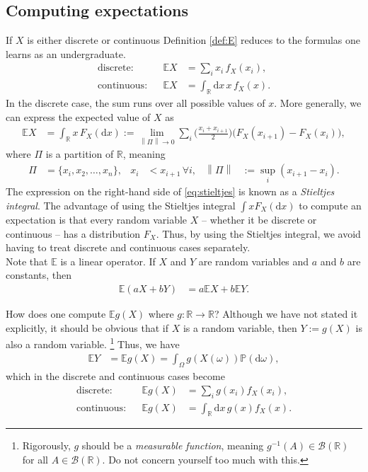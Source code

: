 \documentclass[12pt]{book}
\numberwithin{equation}{chapter}
\theoremstyle{plain}
\numberwithin{theorem}{section}
\theoremstyle{definition}
\numberwithin{exercise}{chapter}
\newcommand{\<}{\langle}
\renewcommand{\>}{\rangle}
\renewcommand{\(}{\left(}
\renewcommand{\)}{\right)}
\renewcommand{\[}{\left[}
\renewcommand{\]}{\right]}
\newcommand\Eb{\mathds{E}}
\newcommand\Pb{\mathds{P}}
\newcommand\Rb{\mathds{R}}
\newcommand\Bc{\mathscr{B}}
\newcommand\om{\omega}
\newcommand\Om{\Omega}
\newcommand\dd{\mathrm{d}}
\newcommand{\norm}[1]{\left\|#1\right\|}
\begin{document}
\subsection{Computing expectations}
If $X$ is either discrete or continuous Definition \ref{def:E} reduces to the formulas one learns as an undergraduate.
\begin{align}
\text{discrete}:&&
\Eb X
	&=	\sum_i x_i \, f_X(x_i) , \\
\text{continuous}:&&
\Eb X
	&=	\int_\Rb \dd x \, x \,  f_X(x) .
\end{align}
In the discrete case, the sum runs over all possible values of $x$.  More generally, we can express the expected value of $X$ as
\begin{align}
\Eb X
	&=	\int_\Rb x \, F_X(\dd x) 
	:=	\lim_{\norm{\Pi} \to 0} \sum_i \Big( \frac{x_i + x_{i+1}}{2} \Big) \Big( F_X(x_{i+1}) - F_X(x_i) \Big) , \label{eq:stieltjes} 
\end{align}
where $\Pi$ is a partition of $\Rb$, meaning
\begin{align}
\Pi
	&=	\{ x_i, x_2, \ldots , x_n \} , &
x_i
	&< x_{i+1} \, \forall i , &
\norm{\Pi}
	&:= \sup_i ( x_{i+1} - x_i ) .
\end{align}
The expression on the right-hand side of \eqref{eq:stieltjes} is known as a \emph{Stieltjes integral}.
The advantage of using the Stieltjes integral $\int x F_X(\dd x)$ to compute an expectation is that every random variable $X$ -- whether it be discrete or continuous -- has a distribution $F_X$.  Thus, by using the Stieltjes integral, we avoid having to treat discrete and continuous cases separately.
\\[0.5em]
Note that $\Eb$ is a linear operator.  If $X$ and $Y$ are random variables and $a$ and $b$ are constants, then
\begin{align}
\Eb( a X + b Y )
	&=	a \Eb X + b \Eb Y .
\end{align}

\noindent
How does one compute $\Eb g(X)$ where $g:\Rb \to \Rb$?  Although we have not stated it explicitly, it should be obvious that if $X$ is a random variable, then $Y:=g(X)$ is also a random variable.
\footnote{Rigorously, $g$ should be a \emph{measurable function}, meaning $g^{-1}(A) \in \Bc(\Rb)$ for all $A \in \Bc(\Rb)$.  Do not concern yourself too much with this.}
Thus, we have
\begin{align}
\Eb Y
	&=	\Eb g(X)
	=		\int_\Om g(X(\om)) \Pb( \dd \om ) ,
\end{align}
which in the discrete and continuous cases become
\begin{align}
\text{discrete}:&&
\Eb g(X)
	&=	\sum_i g(x_i) f_X(x_i) , \\
\text{continuous}:&&
\Eb g(X)
	&=	\int_\Rb \dd x\, g(x) f_X(x) .
\end{align}
\end{document}
